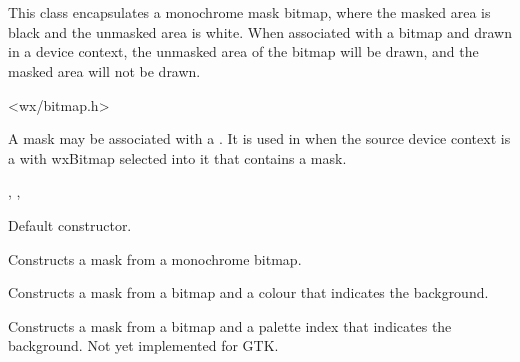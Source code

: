 \section{}\label{wxmask}

This class encapsulates a monochrome mask bitmap, where the masked area is black and
the unmasked area is white. When associated with a bitmap and drawn in a device context,
the unmasked area of the bitmap will be drawn, and the masked area will not be drawn.




<wx/bitmap.h>


A mask may be associated with a . It is used in  when
the source device context is a  with wxBitmap selected into it that
contains a mask.


, , 


\label{wxmaskconstr}


Default constructor.


Constructs a mask from a monochrome bitmap.



Constructs a mask from a bitmap and a colour that indicates the background.



Constructs a mask from a bitmap and a palette index that indicates the background. Not
yet implemented for GTK.


